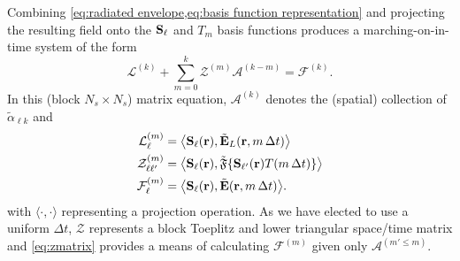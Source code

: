 Combining \cref{eq:radiated envelope,eq:basis function representation} and projecting the resulting field onto the $\vb{S}_\ell$ and $T_m$ basis functions produces a marching-on-in-time system of the form
\begin{equation}
  \mathcal{L}^{(k)} + \sum_{m = 0}^{k} \mathcal{Z}^{(m)} \mathcal{A}^{(k - m)} = \mathcal{F}^{(k)}.
  \label{eq:zmatrix}
\end{equation}
In this (block $N_s \times N_s$) matrix equation, $\mathcal{A}^{(k)}$ denotes the (spatial) collection of $\tilde{\alpha}_{\ell k}$ and
\begin{subequations}
  \begin{align}
    \mathcal{L}^{(m)}_{\ell} &= \big\langle \mathbf{S}_\ell(\vb{r}), \tilde{\vb{E}}_L(\vb{r}, m \, \Delta t) \big\rangle \\
    \mathcal{Z}^{(m)}_{\ell \ell'} &= \big\langle \mathbf{S}_\ell(\vb{r}), \tilde{\mathfrak{F}}\{ \mathbf{S}_{\ell'}(\mathbf{r}) T(m \, \Delta t) \} \big\rangle \\
    \mathcal{F}^{(m)}_\ell &= \big\langle \mathbf{S}_\ell(\vb{r}), \tilde{\mathbf{E}}(\vb{r}, m \, \Delta t) \big\rangle.
  \end{align}
  \label{eq:projections}
\end{subequations}
with $\langle \cdot, \cdot \rangle$ representing a projection operation.
As we have elected to use a uniform $\Delta t$, $\mathcal{Z}$ represents a block Toeplitz and lower triangular space/time matrix and \cref{eq:zmatrix} provides a means of calculating $\mathcal{F}^{(m)}$ given only $\mathcal{A}^{(m' \le m)}$.

